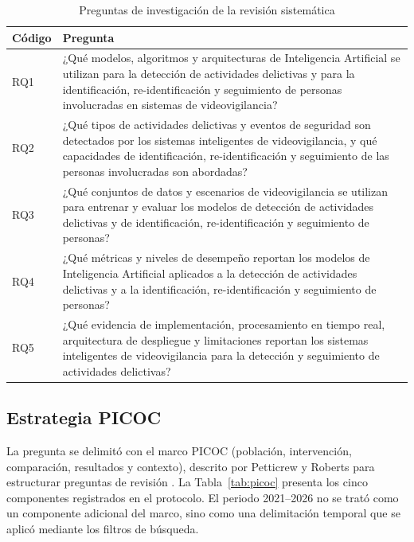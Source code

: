 \documentclass[pdflatex,sn-mathphys-num]{sn-jnl}%
\theoremstyle{thmstyleone}%
\theoremstyle{thmstyletwo}%
\theoremstyle{thmstylethree}%
\begin{document}
\begin{table}[htbp]
\caption{Preguntas de investigación de la revisión sistemática}\label{tab:rq}
\begin{tabular}{@{}L{1.0cm}L{11.5cm}@{}}
\toprule
Código & Pregunta \\
\midrule
RQ1 & ¿Qué modelos, algoritmos y arquitecturas de Inteligencia Artificial se utilizan para la detección de actividades delictivas y para la identificación, re-identificación y seguimiento de personas involucradas en sistemas de videovigilancia? \\
\addlinespace
RQ2 & ¿Qué tipos de actividades delictivas y eventos de seguridad son detectados por los sistemas inteligentes de videovigilancia, y qué capacidades de identificación, re-identificación y seguimiento de las personas involucradas son abordadas? \\
\addlinespace
RQ3 & ¿Qué conjuntos de datos y escenarios de videovigilancia se utilizan para entrenar y evaluar los modelos de detección de actividades delictivas y de identificación, re-identificación y seguimiento de personas? \\
\addlinespace
RQ4 & ¿Qué métricas y niveles de desempeño reportan los modelos de Inteligencia Artificial aplicados a la detección de actividades delictivas y a la identificación, re-identificación y seguimiento de personas? \\
\addlinespace
RQ5 & ¿Qué evidencia de implementación, procesamiento en tiempo real, arquitectura de despliegue y limitaciones reportan los sistemas inteligentes de videovigilancia para la detección y seguimiento de actividades delictivas? \\
\bottomrule
\end{tabular}
\end{table}

\subsection{Estrategia PICOC}\label{subsec:picoc}

La pregunta se delimitó con el marco PICOC (población, intervención, comparación, resultados y contexto), descrito por Petticrew y Roberts para estructurar preguntas de revisión \cite{petticrew2006}. La Tabla~\ref{tab:picoc} presenta los cinco componentes registrados en el protocolo. El periodo 2021--2026 no se trató como un componente adicional del marco, sino como una delimitación temporal que se aplicó mediante los filtros de búsqueda.
\end{document}
